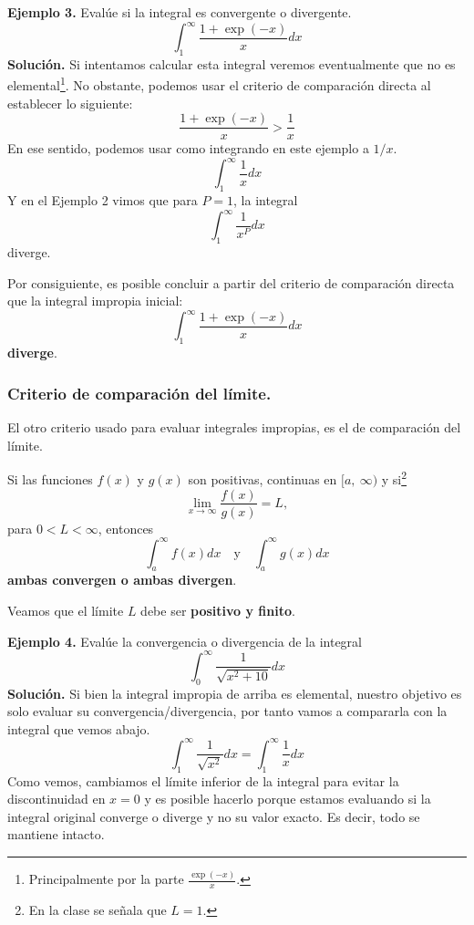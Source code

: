 \documentclass[12pt]{article}
\begin{document}
\textbf{Ejemplo 3.} Evalúe si la integral es convergente o divergente.
\[
  \int_{1}^{\infty} \frac{1 + \exp(-x)}{x} dx
\]
\textbf{Solución.} Si intentamos calcular esta integral veremos eventualmente que no es elemental\footnote{Principalmente por la parte $\frac{\exp(-x)}{x}$.}. No obstante, podemos usar el criterio de comparación directa al establecer lo siguiente:
\[
  \frac{1 + \exp(-x)}{x} > \frac{1}{x}
\]
En ese sentido, podemos usar como integrando en este ejemplo a $1/x$.
\[
  \int_{1}^{\infty} \frac{1}{x} dx
\]
Y en el Ejemplo 2 vimos que para $P = 1$, la integral
\[
  \int_{1}^{\infty} \frac{1}{x^{P}} dx
\]
diverge.

Por consiguiente, es posible concluir a partir del criterio de comparación directa que la integral impropia inicial:
\[
  \int_{1}^{\infty} \frac{1 + \exp(-x)}{x} dx
\]
\textbf{diverge}.

\subsubsection{Criterio de comparación del límite.}

El otro criterio usado para evaluar integrales impropias, es el de comparación del límite.

Si las funciones $f(x)$ y $g(x)$ son positivas, continuas en $[a, \ \infty)$ y si\footnote{En la clase se señala que $L = 1$.}
\[
  \lim_{x \to \infty} \frac{f(x)}{g(x)} = L,
\]
para $0 < L < \infty$, entonces
\[
  \int_{a}^{\infty} f(x)dx \quad \text{y} \quad \int_{a}^{\infty} g(x)dx
\]
\textbf{ambas convergen o ambas divergen}.

Veamos que el límite $L$ debe ser \textbf{positivo y finito}.

\textbf{Ejemplo 4.} Evalúe la convergencia o divergencia de la integral
\[
  \int_{0}^{\infty} \frac{1}{\sqrt{x^{2} + 10}} dx
\]
\textbf{Solución.} Si bien la integral impropia de arriba es elemental, nuestro objetivo es solo evaluar su convergencia/divergencia, por tanto vamos a compararla con la integral que vemos abajo. 
\[
  \int_{1}^{\infty} \frac{1}{\sqrt{x^{2}}} dx = \int_{1}^{\infty} \frac{1}{x} dx
\]
Como vemos, cambiamos el límite inferior de la integral para evitar la discontinuidad en $x = 0$ y es posible hacerlo porque estamos evaluando si la integral original converge o diverge y no su valor exacto. Es decir, todo se mantiene intacto.
\end{document}
